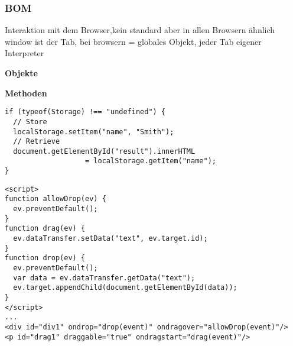 \newpage
\subsubsection{BOM}
Interaktion mit dem Browser,kein standard aber in allen Browsern ähnlich 
window ist der Tab, bei browsern = globales Objekt, jeder Tab eigener Interpreter

\textbf{Objekte}


\textbf{Methoden}

\begin{verbatim}
if (typeof(Storage) !== "undefined") {
  // Store
  localStorage.setItem("name", "Smith"); 
  // Retrieve
  document.getElementById("result").innerHTML 
                   = localStorage.getItem("name");
} 
\end{verbatim}\newpage
{}
\begin{verbatim}
<script>
function allowDrop(ev) {
  ev.preventDefault();
}
function drag(ev) {
  ev.dataTransfer.setData("text", ev.target.id);
}
function drop(ev) {
  ev.preventDefault();
  var data = ev.dataTransfer.getData("text");
  ev.target.appendChild(document.getElementById(data));
}
</script>
...
<div id="div1" ondrop="drop(event)" ondragover="allowDrop(event)"/>
<p id="drag1" draggable="true" ondragstart="drag(event)"/>
\end{verbatim}

